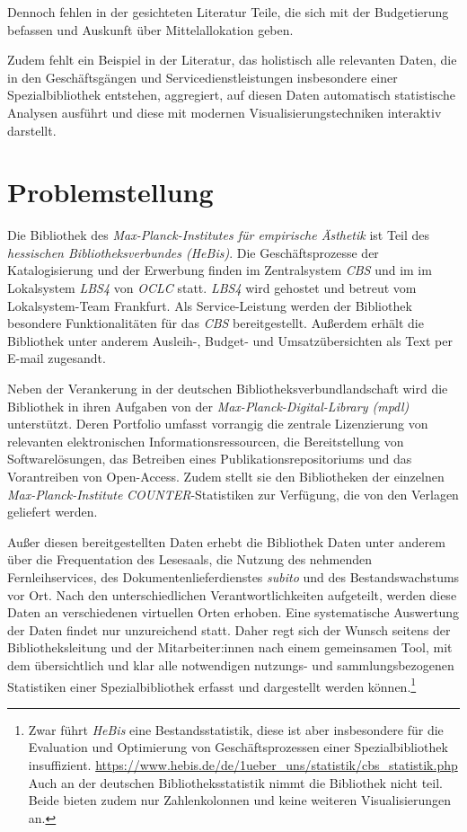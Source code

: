 \documentclass[10pt,a4paper,twocolumn,report]{IEEEtran}
\begin{document}
Dennoch fehlen in der gesichteten Literatur Teile, die sich mit der Budgetierung
befassen und Auskunft über Mittelallokation geben.

Zudem fehlt ein Beispiel in der Literatur, das holistisch alle relevanten Daten, die in den
Geschäftsgängen und Servicedienstleistungen insbesondere einer Spezialbibliothek entstehen,
aggregiert, auf diesen Daten automatisch statistische Analysen ausführt und diese mit modernen Visualisierungstechniken
interaktiv darstellt.


\section{Problemstellung}
Die Bibliothek des \textit{Max-Planck-Institutes für empirische Ästhetik}
ist Teil des \textit{hessischen Bibliotheksverbundes (HeBis)}. Die Geschäftsprozesse
der Katalogisierung und der Erwerbung finden im Zentralsystem \textit{CBS} und im im Lokalsystem \textit{LBS4} von
\textit{OCLC} statt. \textit{LBS4} wird gehostet und betreut vom Lokalsystem-Team Frankfurt. Als Service-Leistung werden der Bibliothek besondere Funktionalitäten
für das \textit{CBS} bereitgestellt. Außerdem erhält die Bibliothek unter anderem Ausleih-, Budget- und
Umsatzübersichten als Text per E-mail zugesandt.


Neben der Verankerung in der deutschen Bibliotheksverbundlandschaft
wird die Bibliothek in ihren Aufgaben von der
\textit{Max-Planck-Digital-Library (mpdl)}
unterstützt. Deren Portfolio umfasst vorrangig die zentrale Lizenzierung
von relevanten elektronischen Informationsressourcen, die Bereitstellung
von Softwarelösungen, das Betreiben eines Publikationsrepositoriums und
das Vorantreiben von Open-Access. Zudem stellt sie den Bibliotheken der einzelnen \textit{Max-Planck-Institute}
\textit{COUNTER}-Statistiken zur Verfügung, die von den Verlagen geliefert werden.

Außer diesen bereitgestellten Daten erhebt die Bibliothek Daten unter anderem über
die Frequentation des Lesesaals, die Nutzung des nehmenden Fernleihservices, des
Dokumentenlieferdienstes \textit{subito} und des Bestandswachstums vor Ort.
Nach den unterschiedlichen Verantwortlichkeiten aufgeteilt, werden diese Daten an verschiedenen virtuellen Orten erhoben.
Eine systematische Auswertung der Daten findet nur unzureichend statt.
Daher regt sich der Wunsch seitens der Bibliotheksleitung und der Mitarbeiter:innen nach einem gemeinsamen Tool,
mit dem übersichtlich und klar alle notwendigen nutzungs- und sammlungsbezogenen Statistiken einer
Spezialbibliothek erfasst und dargestellt werden können.\footnote{Zwar führt \textit{HeBis} eine Bestandsstatistik, diese ist aber insbesondere für die
Evaluation und Optimierung von Geschäftsprozessen einer Spezialbibliothek
insuffizient. \url{https://www.hebis.de/de/1ueber_uns/statistik/cbs_statistik.php} Auch an der deutschen Bibliotheksstatistik nimmt die Bibliothek nicht teil. Beide bieten zudem nur Zahlenkolonnen und keine weiteren Visualisierungen an.}
\end{document}
